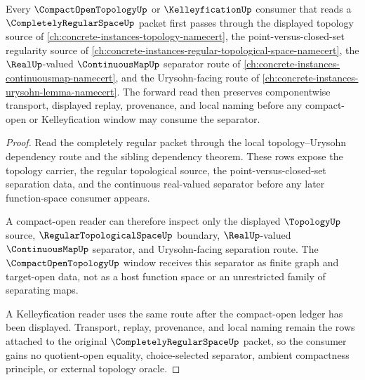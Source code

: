 \begin{theorem}
\label{thm:completely-regular-space-compact-open-forward-route}
Every $\CompactOpenTopologyUp$ or $\KelleyficationUp$ consumer that reads a $\CompletelyRegularSpaceUp$ packet first passes through the displayed topology source of \autoref{ch:concrete-instances-topology-namecert}, the point-versus-closed-set regularity source of \autoref{ch:concrete-instances-regular-topological-space-namecert}, the $\RealUp$-valued $\ContinuousMapUp$ separator route of \autoref{ch:concrete-instances-continuousmap-namecert}, and the Urysohn-facing route of \autoref{ch:concrete-instances-urysohn-lemma-namecert}. The forward read then preserves componentwise transport, displayed replay, provenance, and local naming before any compact-open or Kelleyfication window may consume the separator.
\end{theorem}
\begin{proof}
Read the completely regular packet through the local topology--Urysohn dependency route and the sibling dependency theorem. These rows expose the topology carrier, the regular topological source, the point-versus-closed-set separation data, and the continuous real-valued separator before any later function-space consumer appears.

A compact-open reader can therefore inspect only the displayed $\TopologyUp$ source, $\RegularTopologicalSpaceUp$ boundary, $\RealUp$-valued $\ContinuousMapUp$ separator, and Urysohn-facing separation route. The $\CompactOpenTopologyUp$ window receives this separator as finite graph and target-open data, not as a host function space or an unrestricted family of separating maps.

A Kelleyfication reader uses the same route after the compact-open ledger has been displayed. Transport, replay, provenance, and local naming remain the rows attached to the original $\CompletelyRegularSpaceUp$ packet, so the consumer gains no quotient-open equality, choice-selected separator, ambient compactness principle, or external topology oracle.
\end{proof}

